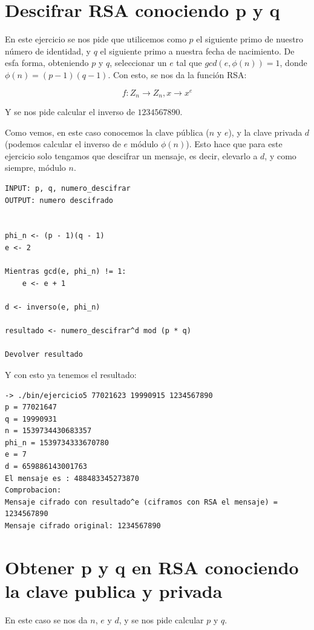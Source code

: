 \documentclass[12pt, spanish]{article}
\begin{document}
\section{Descifrar RSA conociendo p y q}

En este ejercicio se nos pide que utilicemos como $p$ el siguiente primo de nuestro número de identidad, y $q$ el siguiente primo a nuestra fecha de nacimiento. De esfa forma, obteniendo $p$ y $q$, seleccionar un $e$ tal que $gcd(e, \phi(n)) = 1$, donde $\phi(n) = (p - 1)(q - 1)$. Con esto, se nos da la función RSA:

$$
f: Z_n \rightarrow Z_n, x \rightarrow x^e
$$

Y se nos pide calcular el inverso de $1234567890$.

Como vemos, en este caso conocemos la clave pública ($n$ y $e$), y la clave privada $d$ (podemos calcular el inverso de $e$ módulo $\phi(n)$). Esto hace que para este ejercicio solo tengamos que descifrar un mensaje, es decir, elevarlo a $d$, y como siempre, módulo $n$.

\begin{lstlisting}[caption={Funcion desencriptar RSA}]
INPUT: p, q, numero_descifrar
OUTPUT: numero descifrado


phi_n <- (p - 1)(q - 1)
e <- 2

Mientras gcd(e, phi_n) != 1:
	e <- e + 1

d <- inverso(e, phi_n)

resultado <- numero_descifrar^d mod (p * q)

Devolver resultado
\end{lstlisting}

Y con esto ya tenemos el resultado:

\begin{lstlisting}
-> ./bin/ejercicio5 77021623 19990915 1234567890
p = 77021647
q = 19990931
n = 1539734430683357
phi_n = 1539734333670780
e = 7
d = 659886143001763
El mensaje es : 488483345273870
Comprobacion:
Mensaje cifrado con resultado^e (ciframos con RSA el mensaje) = 1234567890
Mensaje cifrado original: 1234567890
\end{lstlisting}


\section{Obtener p y q en RSA conociendo la clave publica y privada}

En este caso se nos da $n$, $e$ y $d$, y se nos pide calcular $p$ y $q$.
\end{document}
